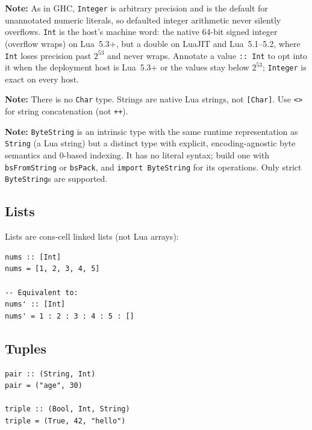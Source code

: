 \documentclass[11pt,a4paper]{article}
\newenvironment{note}{%
  \def\FrameCommand{\fboxsep=3mm \colorbox{notebg}}%
  \MakeFramed{\advance\hsize-\width \FrameRestore}%
  \noindent\textbf{Note:} }%
  {\endMakeFramed}
\begin{document}
\begin{note}
As in GHC, \texttt{Integer} is arbitrary precision and is the default for
unannotated numeric literals, so defaulted integer arithmetic never
silently overflows.  \texttt{Int} is the host's machine word: the native
64-bit signed integer (overflow wraps) on Lua~5.3+, but a double on
LuaJIT and Lua~5.1--5.2, where \texttt{Int} loses precision past
$2^{53}$ and never wraps.  Annotate a value \texttt{:: Int} to opt into
it when the deployment host is Lua~5.3+ or the values stay below
$2^{53}$; \texttt{Integer} is exact on every host.
\end{note}

\begin{note}
There is no \texttt{Char} type.  Strings are native Lua strings, not
\texttt{[Char]}.  Use \texttt{<>} for string concatenation (not \texttt{++}).
\end{note}

\begin{note}
\texttt{ByteString} is an intrinsic type with the same runtime
representation as \texttt{String} (a Lua string) but a distinct type
with explicit, encoding-agnostic byte semantics and 0-based indexing.
It has no literal syntax; build one with \texttt{bsFromString} or
\texttt{bsPack}, and \texttt{import ByteString} for its operations.
Only strict \texttt{ByteString}s are supported.
\end{note}

\subsection{Lists}

Lists are cons-cell linked lists (not Lua arrays):

\begin{lstlisting}
nums :: [Int]
nums = [1, 2, 3, 4, 5]

-- Equivalent to:
nums' :: [Int]
nums' = 1 : 2 : 3 : 4 : 5 : []
\end{lstlisting}

\subsection{Tuples}

\begin{lstlisting}
pair :: (String, Int)
pair = ("age", 30)

triple :: (Bool, Int, String)
triple = (True, 42, "hello")
\end{lstlisting}
\end{document}
